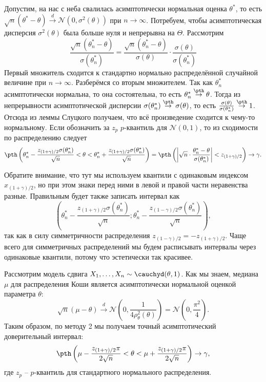 Допустим, на нас с неба свалилась асимптотически нормальная оценка $\theta^*$, то есть $\sqrt{n}(\theta^*-\theta) \stackrel{d}{\to}\mathcal{N}(0, \sigma^2(\theta))$ при $n\to\infty$. Потребуем, чтобы асимптотическая дисперсия $\sigma^2(\theta)$ была больше нуля и непрерывна на $\Theta$. Рассмотрим
\[
\frac{\sqrt{n}(\theta^*_n-\theta)}{\sigma(\theta^*_n)} = \frac{\sqrt{n}(\theta^*_n-\theta)}{\sigma(\theta)} \cdot \frac{\sigma(\theta)}{\sigma(\theta^*_n)}
\]
Первый множитель сходится к стандартно нормально распределённой случайной величине при $n \to \infty$. Разберёмся со вторым множителем. Так как $\theta^*_n$ асимптотически нормальна, то она состоятельна, то есть $\theta^*_n \stackrel{\pth}{\to} \theta$. Тогда из непрерывности асимптотической дисперсии $\sigma(\theta^*_n) \stackrel{\pth}{\to} \sigma(\theta)$, то есть $\frac{\sigma(\theta)}{\sigma(\theta^*_n)} \stackrel{\pth}{\to} 1$. Отсюда из леммы Слуцкого получаем, что всё произведение сходится к чему-то нормальному. Если обозначить за $z_p$ $p$-квантиль для $\mathcal{N}(0, 1)$, то из сходимости по распределению следует
\[
\pth\left(\theta^*_n -\frac{z_{(1+\gamma)/2} \sigma(\theta^*_n)}{\sqrt{n}} < \theta < \theta^*_n + \frac{z_{(1+\gamma)/2} \sigma(\theta^*_n)}{\sqrt{n}}\right) = \pth\left(\left|\sqrt{n}\cdot\frac{\theta^*_n - \theta}{\sigma(\theta^*_n)}\right| < z_{(1+\gamma)/2}\right) \to \gamma.
\]

Обратите внимание, что тут мы используем квантили с одинаковым индексом $x_{(1+\gamma)/2}$, но при этом знаки перед ними в левой и правой части неравенства разные. Правильным будет также записать интервал как
\[
\left(\theta^*_n -\frac{z_{(1+\gamma)/2} \sigma(\theta^*_n)}{\sqrt{n}}; \theta^*_n - \frac{z_{(1-\gamma)/2} \sigma(\theta^*_n)}{\sqrt{n}}\right),
\]
так как в силу симметричности распределения $z_{(1-\gamma)/2} = -z_{(1+\gamma)/2}$. Чаще всего для симметричных распределений мы будем расписывать интервалы через одинаковые квантили, потому что эстетически так красивее.

\begin{example}
    Рассмотрим модель сдвига $X_1, \ldots, X_n \sim \cauchyd(\theta, 1)$. Как мы знаем, медиана $\mu$ для распределения Коши является асимптотически нормальной оценкой параметра $\theta$:
    \[
    \sqrt{n}(\mu - \theta) \stackrel{d}{\to} \mathcal{N}\left(0, \frac{1}{4\rho_{\theta}^2(\theta)}\right) = \mathcal{N}\left(0, \frac{\pi^2}{4}\right).
    \]
    Таким образом, по методу 2 мы получаем точный асимптотический доверительный интервал:
    \[
    \pth\left(\mu - \frac{z_{(1+\gamma)/2}\pi}{2\sqrt{n}} < \theta < \mu + \frac{z_{(1+\gamma)/2}\pi}{2\sqrt{n}}\right) \to \gamma,
    \]
    где $z_p$ -- $p$-квантиль для стандартного нормального распределения.
\end{example}


